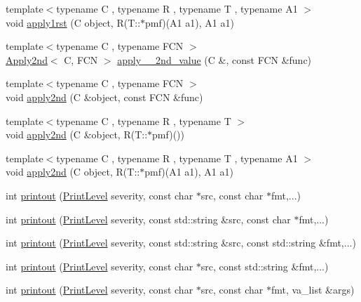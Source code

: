 \begin{DoxyCompactItemize}
\item 
{\footnotesize template$<$typename C , typename R , typename T , typename A1 $>$ }\\void \hyperlink{namespace_d_d4hep_a92f3e4b39b13f1f5808f22cda1740449}{apply1rst} (C object, R(T::$\ast$pmf)(A1 a1), A1 a1)
\item 
{\footnotesize template$<$typename C , typename FCN $>$ }\\\hyperlink{class_d_d4hep_1_1_apply2nd}{Apply2nd}$<$ C, FCN $>$ \hyperlink{namespace_d_d4hep_a9d26642403053ea0be3a5892db7f2d2d}{apply\_\-\_\-2nd\_\-value} (C \&, const FCN \&func)
\item 
{\footnotesize template$<$typename C , typename FCN $>$ }\\void \hyperlink{namespace_d_d4hep_a4baf120e3ac805eb41cd8d5f7d901f22}{apply2nd} (C \&object, const FCN \&func)
\item 
{\footnotesize template$<$typename C , typename R , typename T $>$ }\\void \hyperlink{namespace_d_d4hep_ac6576c9c96df03d7042f00e804163831}{apply2nd} (C \&object, R(T::$\ast$pmf)())
\item 
{\footnotesize template$<$typename C , typename R , typename T , typename A1 $>$ }\\void \hyperlink{namespace_d_d4hep_a650e5d4f3c98aec06caa072a5cd89522}{apply2nd} (C object, R(T::$\ast$pmf)(A1 a1), A1 a1)
\item 
int \hyperlink{namespace_d_d4hep_a6d434af620a49074f3d86d05a04b6073}{printout} (\hyperlink{namespace_d_d4hep_a5b5a64d56252469451f2020a27d57d42}{PrintLevel} severity, const char $\ast$src, const char $\ast$fmt,...)
\item 
int \hyperlink{namespace_d_d4hep_a56158e35364c45902f21968cd334c53f}{printout} (\hyperlink{namespace_d_d4hep_a5b5a64d56252469451f2020a27d57d42}{PrintLevel} severity, const std::string \&src, const char $\ast$fmt,...)
\item 
int \hyperlink{namespace_d_d4hep_a335f9a94367d028c2719a77bfccfb2d2}{printout} (\hyperlink{namespace_d_d4hep_a5b5a64d56252469451f2020a27d57d42}{PrintLevel} severity, const std::string \&src, const std::string \&fmt,...)
\item 
int \hyperlink{namespace_d_d4hep_a40471a3209c63eb0f25dcad8c5f0e3d6}{printout} (\hyperlink{namespace_d_d4hep_a5b5a64d56252469451f2020a27d57d42}{PrintLevel} severity, const char $\ast$src, const std::string \&fmt,...)
\item 
int \hyperlink{namespace_d_d4hep_ad4be91cbf746f4c9fc6f175c371c14c3}{printout} (\hyperlink{namespace_d_d4hep_a5b5a64d56252469451f2020a27d57d42}{PrintLevel} severity, const char $\ast$src, const char $\ast$fmt, va\_\-list \&args)

\end{DoxyCompactItemize}
